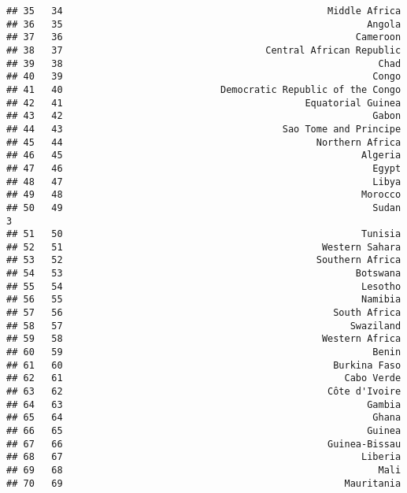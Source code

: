 \documentclass[]{article}
\begin{document}
\begin{verbatim}
## 35   34                                               Middle Africa   
## 36   35                                                      Angola   
## 37   36                                                    Cameroon   
## 38   37                                    Central African Republic   
## 39   38                                                        Chad   
## 40   39                                                       Congo   
## 41   40                            Democratic Republic of the Congo   
## 42   41                                           Equatorial Guinea   
## 43   42                                                       Gabon   
## 44   43                                       Sao Tome and Principe   
## 45   44                                             Northern Africa   
## 46   45                                                     Algeria   
## 47   46                                                       Egypt   
## 48   47                                                       Libya   
## 49   48                                                     Morocco   
## 50   49                                                       Sudan  3
## 51   50                                                     Tunisia   
## 52   51                                              Western Sahara   
## 53   52                                             Southern Africa   
## 54   53                                                    Botswana   
## 55   54                                                     Lesotho   
## 56   55                                                     Namibia   
## 57   56                                                South Africa   
## 58   57                                                   Swaziland   
## 59   58                                              Western Africa   
## 60   59                                                       Benin   
## 61   60                                                Burkina Faso   
## 62   61                                                  Cabo Verde   
## 63   62                                               Côte d'Ivoire   
## 64   63                                                      Gambia   
## 65   64                                                       Ghana   
## 66   65                                                      Guinea   
## 67   66                                               Guinea-Bissau   
## 68   67                                                     Liberia   
## 69   68                                                        Mali   
## 70   69                                                  Mauritania   

\end{verbatim}
\end{document}
